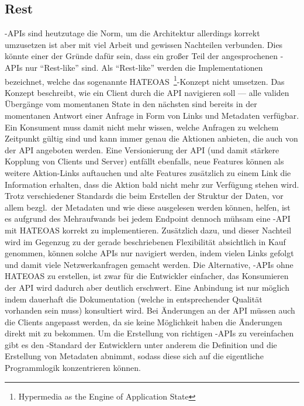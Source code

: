 \subsection{Rest}
-APIs sind heutzutage die Norm, um die Architektur allerdings korrekt umzusetzen ist aber mit viel Arbeit und gewissen Nachteilen verbunden. Dies könnte einer der Gründe dafür sein, dass ein großer Teil der angesprochenen -APIs nur ``Rest-like'' sind. Als ``Rest-like'' werden die Implementationen bezeichnet, welche das sogenannte HATEOAS~\footnote{Hypermedia as the Engine of Application State}-Konzept nicht umsetzen. Das Konzept beschreibt, wie ein Client durch die API navigieren soll --- alle validen Übergänge vom momentanen State in den nächsten sind bereits in der momentanen Antwort einer Anfrage in Form von Links und Metadaten verfügbar. Ein Konsument muss damit nicht mehr wissen, welche Anfragen zu welchem Zeitpunkt gültig sind und kann immer genau die Aktionen anbieten, die auch von der API angeboten werden. Eine Versionierung der API (und damit stärkere Kopplung von Clients und Server) entfällt ebenfalls, neue Features können als weitere Aktion-Links auftauchen und alte Features zusätzlich zu einem Link die Information erhalten, dass die Aktion bald nicht mehr zur Verfügung stehen wird. Trotz verschiedener Standards die beim Erstellen der Struktur der Daten, vor allem bezgl.\ der Metadaten und wie diese ausgelesen werden können, helfen, ist es aufgrund des Mehraufwands bei jedem Endpoint dennoch mühsam eine -API mit HATEOAS korrekt zu implementieren. Zusätzlich dazu, und dieser Nachteil wird im Gegenzug zu der gerade beschriebenen Flexibilität absichtlich in Kauf genommen, können solche APIs nur navigiert werden, indem vielen Links gefolgt und damit viele Netzwerkanfragen gemacht werden. 
Die Alternative, -APIs ohne HATEOAS zu erstellen, ist zwar für die Entwickler einfacher, das Konsumieren der API wird dadurch aber deutlich erschwert. Eine Anbindung ist nur möglich indem dauerhaft die Dokumentation (welche in entsprechender Qualität vorhanden sein muss) konsultiert wird. Bei Änderungen an der API müssen auch die Clients angepasst werden, da sie keine Möglichkeit haben die Änderungen direkt mit zu bekommen.
Um die Erstellung von richtigen -APIs zu vereinfachen gibt es den -Standard der Entwicklern unter anderem die Definition und die Erstellung von Metadaten abnimmt, sodass diese sich auf die eigentliche Programmlogik konzentrieren können.

